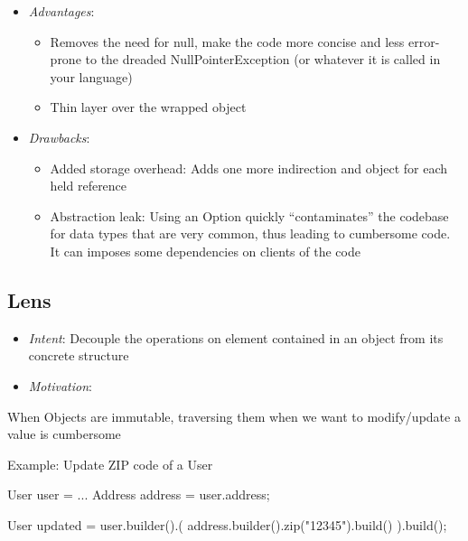 \documentclass[11pt,]{article}
\newenvironment{Shaded}{}{}
\newcommand{\StringTok}[1]{\textcolor[rgb]{0.25,0.44,0.63}{{#1}}}
\newcommand{\FunctionTok}[1]{\textcolor[rgb]{0.02,0.16,0.49}{{#1}}}
\newcommand{\NormalTok}[1]{{#1}}
\begin{document}
\begin{itemize}
\item
  \emph{Advantages}:

  \begin{itemize}
  \item
    Removes the need for null, make the code more concise and less
    error-prone to the dreaded NullPointerException (or whatever it is
    called in your language)
  \item
    Thin layer over the wrapped object
  \end{itemize}
\item
  \emph{Drawbacks}:

  \begin{itemize}
  \item
    Added storage overhead: Adds one more indirection and object for
    each held reference
  \item
    Abstraction leak: Using an Option quickly ``contaminates'' the
    codebase for data types that are very common, thus leading to
    cumbersome code. It can imposes some dependencies on clients of the
    code
  \end{itemize}
\end{itemize}

\subsection{Lens}

\begin{itemize}
\item
  \emph{Intent}: Decouple the operations on element contained in an
  object from its concrete structure
\item
  \emph{Motivation}:
\end{itemize}

When Objects are immutable, traversing them when we want to
modify/update a value is cumbersome

Example: Update ZIP code of a User

\begin{Shaded}
\begin{Highlighting}[]
\NormalTok{User user = ...}
\NormalTok{Address address = user.}\FunctionTok{address}\NormalTok{;}

\NormalTok{User updated = user.}\FunctionTok{builder}\NormalTok{().(}
   \NormalTok{address.}\FunctionTok{builder}\NormalTok{().}\FunctionTok{zip}\NormalTok{(}\StringTok{"12345"}\NormalTok{).}\FunctionTok{build}\NormalTok{()}
  \NormalTok{).}\FunctionTok{build}\NormalTok{();}
\end{Highlighting}
\end{Shaded}
\end{document}

